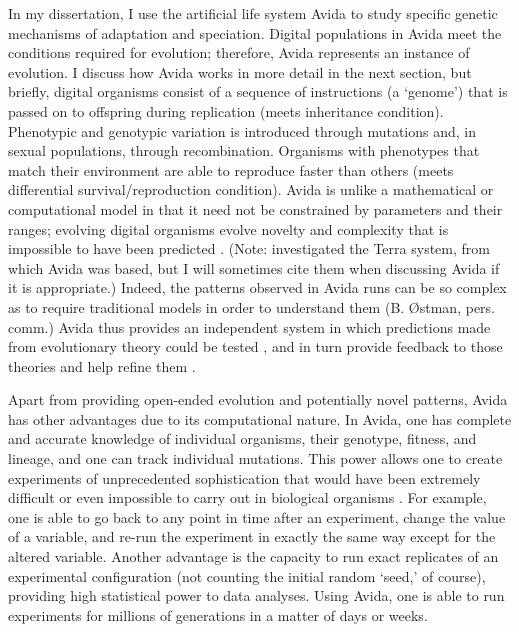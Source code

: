 \begin{doublespace}
In my dissertation, I use the artificial life system Avida \citep{ofr04}
to study specific genetic mechanisms of adaptation and speciation.
%
Digital populations in Avida meet the conditions required for evolution;
therefore, Avida represents an instance of evolution.
%
I discuss how Avida works in more detail in the next section, but briefly,
digital organisms consist of a sequence of instructions (a `genome')
that is passed on to offspring during replication (meets inheritance condition).
%
Phenotypic and genotypic variation is introduced through mutations
and, in sexual populations, through recombination.
%
Organisms with phenotypes that match their environment
are able to reproduce faster than others
(meets differential survival/reproduction condition).
%
Avida is unlike a mathematical or computational model
in that it need not be constrained by parameters and their ranges;
evolving digital organisms evolve novelty and complexity
that is impossible to have been predicted \citep{yed01,wil02}.
%
(Note: \citet{yed01} investigated the Terra system,
from which Avida was based, but I will sometimes cite them
when discussing Avida if it is appropriate.)
%
Indeed, the patterns observed in Avida runs can be so complex
as to require traditional models in order to understand them
(B. \O stman, pers. comm.)
%
Avida thus provides an independent system in which predictions
made from evolutionary theory could be tested \citep{yed01},
and in turn provide feedback to those theories
and help refine them \citep{wil02}.



Apart from providing open-ended evolution and potentially novel patterns,
Avida has other advantages due to its computational nature.
%
In Avida, one has complete and accurate knowledge of individual organisms,
their genotype, fitness, and lineage, and one can track individual mutations.
%
This power allows one to create experiments of unprecedented sophistication
that would have been extremely difficult or even impossible
to carry out in biological organisms \citep{ele03}.
%
For example, one is able to go back to any point in time after an experiment,
change the value of a variable, and re-run the experiment
in exactly the same way except for the altered variable.
%
Another advantage is the capacity to run exact replicates
of an experimental configuration
(not counting the initial random `seed,' of course),
providing high statistical power to data analyses.
%
Using Avida, one is able to run experiments for millions of generations
in a matter of days or weeks.




\end{doublespace}
